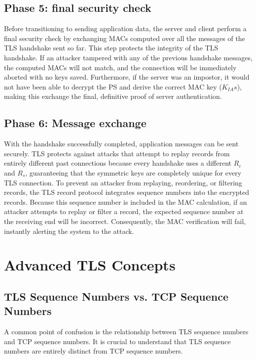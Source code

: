 

\subsection{Phase 5: final security check}
Before transitioning to sending application data, the server and client perform a final security check by exchanging MACs computed over all the messages of the TLS handshake sent so far. This step protects the integrity of the TLS handshake. If an attacker tampered with any of the previous handshake messages, the computed MACs will not match, and the connection will be immediately aborted with no keys saved. Furthermore, if the server was an impostor, it would not have been able to decrypt the PS and derive the correct MAC key ($K_{IA}s$), making this exchange the final, definitive proof of server authentication.


\subsection{Phase 6: Message exchange}
With the handshake successfully completed, application messages can be sent securely. TLS protects against attacks that attempt to replay records from entirely different past connections because every handshake uses a different $R_c$ and $R_s$, guaranteeing that the symmetric keys are completely unique for every TLS connection.
To prevent an attacker from replaying, reordering, or filtering records, the TLS record protocol integrates sequence numbers into the encrypted records. Because this sequence number is included in the MAC calculation, if an attacker attempts to replay or filter a record, the expected sequence number at the receiving end will be incorrect. Consequently, the MAC verification will fail, instantly alerting the system to the attack.



\section{Advanced TLS Concepts}


\subsection{TLS Sequence Numbers vs. TCP Sequence Numbers}
A common point of confusion is the relationship between TLS sequence numbers and TCP sequence numbers. It is crucial to understand that TLS sequence numbers are entirely distinct from TCP sequence numbers.

